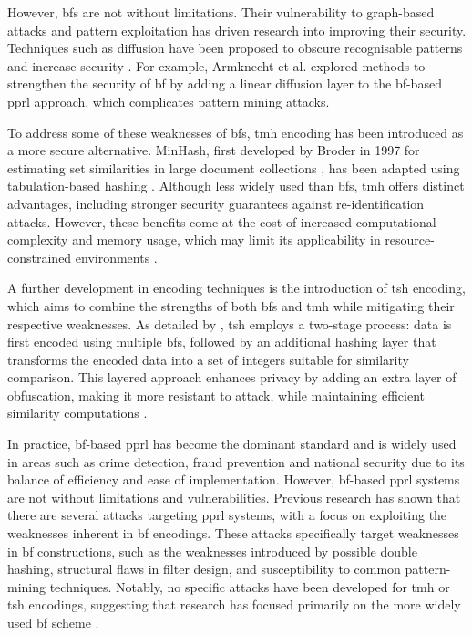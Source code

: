 However, \ac{bf}s are not without limitations.
Their vulnerability to graph-based attacks and pattern exploitation has driven research into improving their security.
Techniques such as diffusion have been proposed to obscure recognisable patterns and increase security \cite{schaefer2024,armknecht2023strengthening}.
For example, Armknecht et al. \cite{armknecht2023strengthening} explored methods to strengthen the security of \ac{bf} by adding a linear diffusion layer to the \ac{bf}-based \ac{pprl} approach, which complicates pattern mining attacks.

To address some of these weaknesses of \ac{bf}s, \ac{tmh} encoding has been introduced as a more secure alternative.
MinHash, first developed by Broder in 1997 for estimating set similarities in large document collections \cite{broder1997resemblance}, has been adapted using tabulation-based hashing \cite{smith2017secure}.
Although less widely used than \ac{bf}s, \ac{tmh} offers distinct advantages, including stronger security guarantees against re-identification attacks.
However, these benefits come at the cost of increased computational complexity and memory usage, which may limit its applicability in resource-constrained environments \cite{smith2017secure}.

A further development in encoding techniques is the introduction of \ac{tsh} encoding, which aims to combine the strengths of both \ac{bf}s and \ac{tmh} while mitigating their respective weaknesses.
As detailed by \cite{ranbaduge2020secure}, \ac{tsh} employs a two-stage process: data is first encoded using multiple \ac{bf}s, followed by an additional hashing layer that transforms the encoded data into a set of integers suitable for similarity comparison.
This layered approach enhances privacy by adding an extra layer of obfuscation, making it more resistant to attack, while maintaining efficient similarity computations \cite{vidanage2020graph, ranbaduge2020secure}.

In practice, \ac{bf}-based \ac{pprl} has become the dominant standard and is widely used in areas such as crime detection, fraud prevention and national security due to its balance of efficiency and ease of implementation.
However, \ac{bf}-based \ac{pprl} systems are not without limitations and vulnerabilities.
Previous research has shown that there are several attacks targeting \ac{pprl} systems, with a focus on exploiting the weaknesses inherent in \ac{bf} encodings.
These attacks specifically target weaknesses in \ac{bf} constructions, such as the weaknesses introduced by possible double hashing, structural flaws in filter design, and susceptibility to common pattern-mining techniques.
Notably, no specific attacks have been developed for \ac{tmh} or \ac{tsh} encodings, suggesting that research has focused primarily on the more widely used \ac{bf} scheme \cite{vidanage2020graph}.

